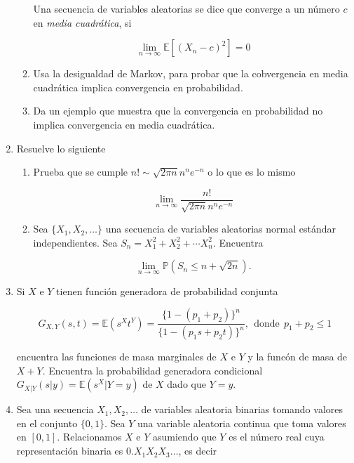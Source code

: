 \documentclass[a4paper,11pt]{report}
\begin{document}
\begin{enumerate}
\begin{enumerate}
	\vspace{0.2cm}
	
	
	Una secuencia de variables aleatorias se dice que converge a un n\'umero $c$ en \textit{media cuadr\'atica}, si
	
	\[
	\lim_{n \rightarrow \infty}\mathbb{E}[(X_n - c)^2] = 0
	\]
	
	
	\item Usa la desigualdad de Markov, para probar que la cobvergencia en media cuadr\'atica implica convergencia en probabilidad.
	\item Da un ejemplo que muestra que la convergencia en probabilidad no implica convergencia en media cuadr\'atica.
\end{enumerate}





\item  Resuelve lo siguiente

\begin{enumerate}
	\item Prueba que se cumple  $n! \sim \sqrt{2\pi n}n^ne^{-n}$ o lo que es lo mismo
	
	\[
	\lim_{n \rightarrow \infty}\dfrac{n!}{\sqrt{2\pi n}n^ne^{-n}}
	\]
	
	\item Sea $\{X_1, X_2, \dots  \}$ una secuencia de variables aleatorias normal est\'andar independientes. Sea $S_n = X_1^2 + X_2^2 + \cdots X_n^2$. Encuentra
	
	\[
	\lim_{n \rightarrow \infty}\mathbb{P}(S_n \leq n + \sqrt{2n}).
	\] 
\end{enumerate}

\item  Si $X$ e $Y$ tienen funci\'on generadora de probabilidad conjunta

\[
G_{X,Y}(s, t) = \mathbb{E}(s^Xt^Y) = \frac{\{1 - (p_1 + p_2)\}^n}{\{1 - (p_1s + p_2t)\}^n}, \ \  \text{donde}\ \ p_1 + p_2 \leq 1
\]

encuentra las funciones de masa marginales de $X$ e $Y$ y la func\'on  de masa de $X + Y$. Encuentra la probabilidad generadora condicional $G_{X|Y}(s | y) = \mathbb{E}(s^X| Y = y)$ de $X$ dado que $Y = y$. 

\item  Sea una secuencia $X_1, X_2, \dots$ de variables aleatoria binarias tomando valores en el \mbox{conjunto} $\{0, 1\}$. Sea $Y$ una variable aleatoria continua que toma valores en $[0, 1]$. Relacionamos $X$ e $Y$ \mbox{asumiendo} que $Y$ es el n\'umero real cuya representaci\'on binaria es $0.X_1X_2X_3\dots$, es decir


\end{enumerate}
\end{document}
